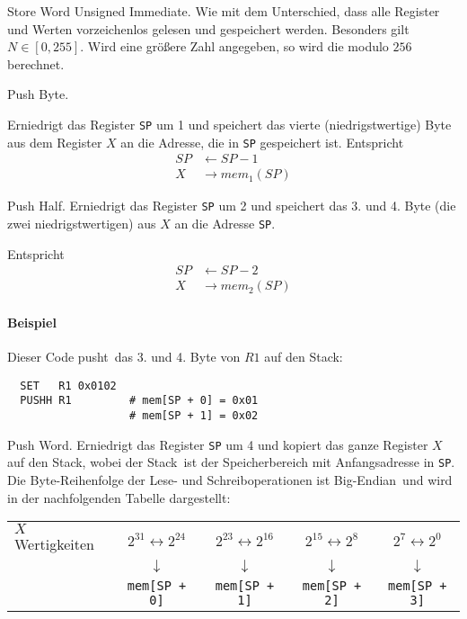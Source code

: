\glqq Store Word Unsigned Immediate\grqq.
Wie  mit dem Unterschied, dass alle Register und Werten vorzeichenlos
gelesen und gespeichert werden. Besonders gilt $N \in [0, 255]$. Wird eine
größere Zahl angegeben, so wird die modulo $256$ berechnet.



\glqq Push Byte\grqq.

Erniedrigt das Register \texttt{SP} um 1 und speichert das vierte
(niedrigstwertige) Byte aus dem Register $X$ an die Adresse, die in \texttt{SP}
gespeichert ist.
Entspricht
\begin{align*}
  SP & \gets SP - 1    \\
  X  & \to mem_{1}(SP)
\end{align*}



\glqq Push Half\grqq.
Erniedrigt das Register \texttt{SP} um 2 und speichert das 3. und 4. Byte (die
zwei niedrigstwertigen) aus $X$ an die Adresse \texttt{SP}.

Entspricht
\begin{align*}
  SP & \gets SP - 2    \\
  X  & \to mem_{2}(SP)
\end{align*}

\paragraph{Beispiel}
Dieser Code \glqq pusht\grqq\ das 3. und 4. Byte von $R1$ auf den Stack:
\begin{lstlisting}
  SET   R1 0x0102
  PUSHH R1         # mem[SP + 0] = 0x01
                   # mem[SP + 1] = 0x02
\end{lstlisting}


\glqq Push Word\grqq.
Erniedrigt das Register \texttt{SP} um 4 und kopiert das ganze Register $X$ auf
den Stack, wobei der \glqq Stack\grqq\ ist der Speicherbereich mit
Anfangsadresse in \texttt{SP}.
Die Byte-Reihenfolge der Lese- und Schreiboperationen ist \glqq Big-Endian\grqq\
und wird in der nachfolgenden Tabelle dargestellt:
\begin{center}
\begin{tabular}{l|cccc}
  \toprule
  $X$  Wertigkeiten &
  $2^{31} \leftrightarrow 2^{24}$ &
  $2^{23} \leftrightarrow 2^{16}$ &
  $2^{15} \leftrightarrow 2^{8}$  &
  $2^{7}  \leftrightarrow 2^{0}$ 
  \\
  &
  $\downarrow$ & $\downarrow$ & $\downarrow$ & $\downarrow$ 
  \\
  \text{Stack-Bereich} &
  \texttt{mem[SP + 0]} &
  \texttt{mem[SP + 1]} &
  \texttt{mem[SP + 2]} &
  \texttt{mem[SP + 3]}
  \\\bottomrule
\end{tabular}
\end{center}




